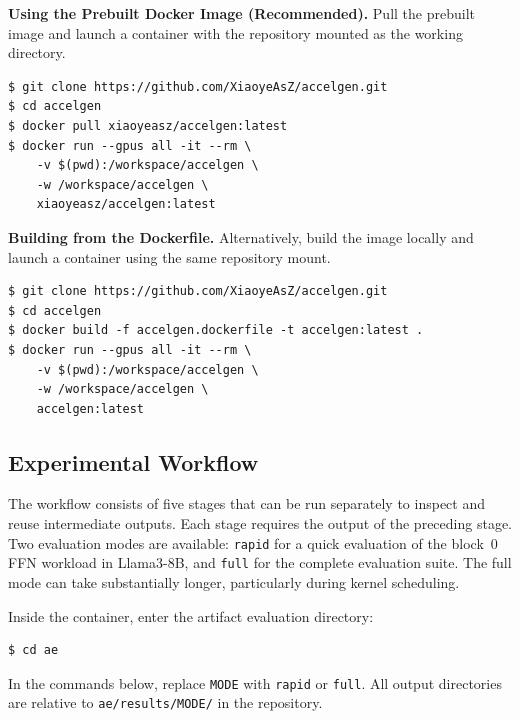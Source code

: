 \textbf{Using the Prebuilt Docker Image (Recommended).} Pull the prebuilt
image and launch a container with the repository mounted as the working
directory.

\begin{verbatim}
$ git clone https://github.com/XiaoyeAsZ/accelgen.git
$ cd accelgen
$ docker pull xiaoyeasz/accelgen:latest
$ docker run --gpus all -it --rm \
    -v $(pwd):/workspace/accelgen \
    -w /workspace/accelgen \
    xiaoyeasz/accelgen:latest
\end{verbatim}

\textbf{Building from the Dockerfile.} Alternatively, build the image locally
and launch a container using the same repository mount.

\begin{verbatim}
$ git clone https://github.com/XiaoyeAsZ/accelgen.git
$ cd accelgen
$ docker build -f accelgen.dockerfile -t accelgen:latest .
$ docker run --gpus all -it --rm \
    -v $(pwd):/workspace/accelgen \
    -w /workspace/accelgen \
    accelgen:latest
\end{verbatim}

\subsection{Experimental Workflow}

The workflow consists of five stages that can be run separately to inspect
and reuse intermediate outputs. Each stage requires the output of the
preceding stage. Two evaluation modes are available: \texttt{rapid} for a
quick evaluation of the block~0 FFN workload in Llama3-8B, and \texttt{full}
for the complete evaluation suite. The full mode can take substantially
longer, particularly during kernel scheduling.

Inside the container, enter the artifact evaluation directory:

\begin{verbatim}
$ cd ae
\end{verbatim}

In the commands below, replace \texttt{MODE} with \texttt{rapid} or
\texttt{full}. All output directories are relative to
\texttt{ae/results/MODE/} in the repository.

